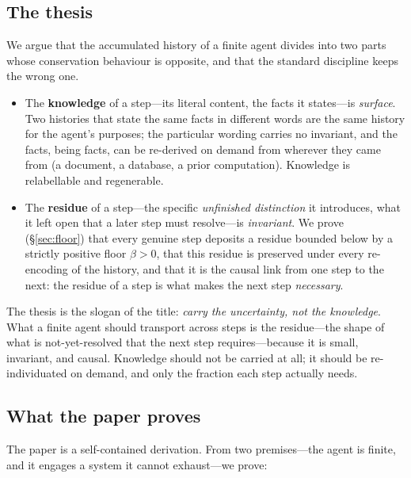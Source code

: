 \documentclass[11pt,twocolumn,a4paper]{article}
\theoremstyle{thmstyle}
\theoremstyle{definition}
\theoremstyle{remark}
\newcommand{\flo}{\beta}                %
\begin{document}
\subsection{The thesis}

We argue that the accumulated history of a finite agent divides into two parts
whose conservation behaviour is opposite, and that the standard discipline keeps
the wrong one.

\begin{itemize}[leftmargin=1.4em,itemsep=2pt]
\item The \textbf{knowledge} of a step---its literal content, the facts it
states---is \emph{surface}. Two histories that state the same facts in different
words are the same history for the agent's purposes; the particular wording
carries no invariant, and the facts, being facts, can be re-derived on demand
from wherever they came from (a document, a database, a prior computation).
Knowledge is relabellable and regenerable.
\item The \textbf{residue} of a step---the specific \emph{unfinished
distinction} it introduces, what it left open that a later step must resolve---is
\emph{invariant}. We prove (\S\ref{sec:floor}) that every genuine step deposits
a residue bounded below by a strictly positive floor $\flo>0$, that this residue
is preserved under every re-encoding of the history, and that it is the causal
link from one step to the next: the residue of a step is what makes the next
step \emph{necessary}.
\end{itemize}

The thesis is the slogan of the title: \emph{carry the uncertainty, not the
knowledge}. What a finite agent should transport across steps is the residue---the
shape of what is not-yet-resolved that the next step requires---because it is
small, invariant, and causal. Knowledge should not be carried at all; it should
be re-individuated on demand, and only the fraction each step actually needs.

\subsection{What the paper proves}

The paper is a self-contained derivation. From two premises---the agent is
finite, and it engages a system it cannot exhaust---we prove:
\end{document}
